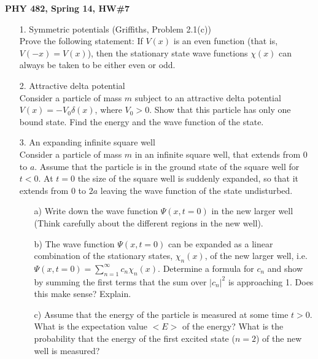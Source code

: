 \documentclass[11pt]{article}
\begin{document}
\thispagestyle{empty}

\centerline{\bf PHY 482, Spring 14, HW\#7}

\begin{itemize}
%
\item[1.] Symmetric potentials (Griffiths, Problem 2.1(c))\\
Prove the following statement: If $V(x)$ is an even function (that is, $V(-x)=V(x)$), then the stationary state
wave functions $\chi(x)$ can always be taken to be either even or odd.
%
\vspace*{0.5cm}
%
%
%
\item[2.] Attractive delta potential\\
Consider a particle of mass $m$ subject to an attractive delta potential $V(x) = -V_0 \delta(x)$, where $V_0 > 0$.
Show that this particle has only one bound state. Find the energy and the wave function of the state.
%
\vspace*{0.5cm}
%
\item[3.] An expanding infinite square well\\
Consider a particle of mass $m$ in an infinite square well, that extends from 0 to $a$. Assume that the particle is in the ground state of the square well for $t<0$. At $t=0$ the size of the square well is suddenly expanded, so that it extends
from 0 to $2a$ leaving the wave function of the state undisturbed.
\begin{itemize}
\item[a)]
Write down the wave function $\Psi(x,t=0)$ in the new larger well (Think carefully about the different regions in the new well).
\item[b)]
The wave function $\Psi(x,t=0)$ can be expanded as a linear combination of the stationary states, $\chi_n(x)$, of the new larger well, i.e. $\Psi(x,t=0) = \sum\limits_{n=1}^\infty c_n \chi_n(x)$. Determine a formula for $c_n$ and show by summing the first terms that the sum over $|c_n|^2$ is approaching 1. Does this make sense? Explain.
\item[c)]
Assume that the energy of the particle is measured at some time $t > 0$. What is the expectation value $<E>$ of the energy? What is the probability that the energy of the first excited state ($n=2$) of the new well is measured?

\end{itemize}
\end{itemize}
\end{document}
